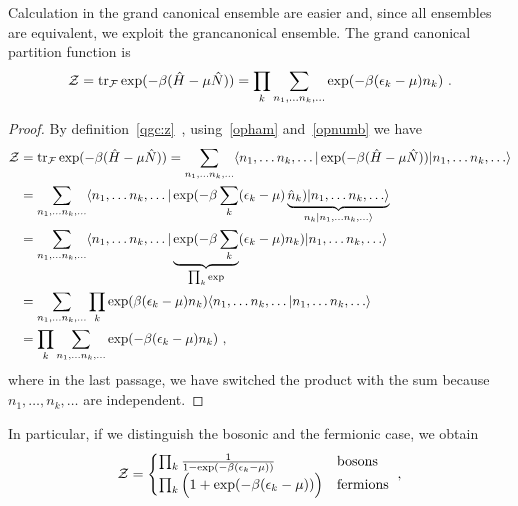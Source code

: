     Calculation in the grand canonical ensemble are easier and, since all ensembles are equivalent, we exploit the grancanonical ensemble. The grand canonical partition function is 
    \begin{equation*}
        \mathcal Z = \operatorname{tr}_{\mathcal F} \exp(- \beta (\hat H - \mu \hat N)) = \prod_k \sum_{n_1, \ldots n_k, \ldots} \exp(-\beta(\epsilon_k - \mu)n_k) ~.
    \end{equation*}
    \begin{proof}
        By definition~\eqref{qgc:z}~, using~\eqref{opham} and~\eqref{opnumb} we have
        \begin{equation*}
        \begin{aligned}
            \mathcal Z & = \operatorname{tr}_{\mathcal F} \exp(- \beta (\hat H - \mu \hat N)) = \sum_{n_1, \ldots n_k, \ldots} \langle n_1, \ldots n_k, \ldots\vert \exp(- \beta (\hat H - \mu \hat N)) \vert n_1, \ldots n_k, \ldots\rangle \\ & = \sum_{n_1, \ldots n_k, \ldots} \langle n_1, \ldots n_k, \ldots\vert \exp(- \beta \sum_k (\epsilon_k - \mu) \underbrace{\hat n_k) \vert n_1, \ldots n_k, \ldots\rangle}_{n_k \vert n_1, \ldots n_k, \ldots\rangle} \\ & = \sum_{n_1, \ldots n_k, \ldots} \langle n_1, \ldots n_k, \ldots\vert \underbrace{\exp(- \beta \sum_k}_{\prod_k \exp} (\epsilon_k - \mu) n_k) \vert n_1, \ldots n_k, \ldots\rangle \\ & = \sum_{n_1, \ldots n_k, \ldots} \prod_k \exp(\beta (\epsilon_k - \mu) n_k) \langle n_1, \ldots n_k, \ldots\vert n_1, \ldots n_k, \ldots\rangle \\ & = \prod_k \sum_{n_1, \ldots n_k, \ldots} \exp(-\beta(\epsilon_k - \mu)n_k) ~,
        \end{aligned}
        \end{equation*}
        where in the last passage, we have switched the product with the sum because $n_1, \ldots, n_k, \ldots$ are independent.
    \end{proof}
    In particular, if we distinguish the bosonic and the fermionic case, we obtain
    \begin{equation*}
        \mathcal Z = \begin{cases}
            \prod_k \frac{1}{1 - \exp (- \beta (\epsilon_k - \mu))} & \textnormal{bosons} \\
            \prod_k \Big (1 + \exp (- \beta (\epsilon_k - \mu)) \Big ) & \textnormal{fermions} \\
        \end{cases} ~,
    \end{equation*}
